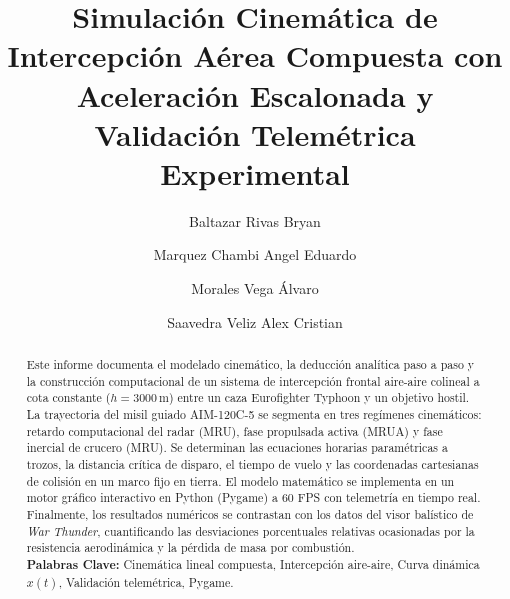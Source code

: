 \documentclass[11pt,letterpaper]{article}
\title{\textbf{Simulación Cinemática de Intercepción Aérea Compuesta con Aceleración Escalonada y Validación Telemétrica Experimental}}
\author[1,2]{Baltazar Rivas Bryan}
\author[1,2]{Marquez Chambi Angel Eduardo}
\author[1,2]{Morales Vega Álvaro}
\author[1,2]{Saavedra Veliz Alex Cristian}
\affil[1]{Departamento de Informática y Sistemas, Universidad Mayor de San Simón}
\affil[2]{Facultad de Ciencias y Tecnología, Universidad Mayor de San Simón}
\date{}
\begin{document}

\setcounter{page}{1}

\maketitle

\begin{abstract}
Este informe documenta el modelado cinemático, la deducción analítica paso a paso y la construcción computacional de un sistema de intercepción frontal aire-aire colineal a cota constante ($h = 3000\,\text{m}$) entre un caza Eurofighter Typhoon y un objetivo hostil. La trayectoria del misil guiado AIM-120C-5 se segmenta en tres regímenes cinemáticos: retardo computacional del radar (MRU), fase propulsada activa (MRUA) y fase inercial de crucero (MRU). Se determinan las ecuaciones horarias paramétricas a trozos, la distancia crítica de disparo, el tiempo de vuelo y las coordenadas cartesianas de colisión en un marco fijo en tierra. El modelo matemático se implementa en un motor gráfico interactivo en Python (Pygame) a 60 FPS con telemetría en tiempo real. Finalmente, los resultados numéricos se contrastan con los datos del visor balístico de \textit{War Thunder}, cuantificando las desviaciones porcentuales relativas ocasionadas por la resistencia aerodinámica y la pérdida de masa por combustión.
\\[0.5em]
\textbf{Palabras Clave:} Cinemática lineal compuesta, Intercepción aire-aire, Curva dinámica $x(t)$, Validación telemétrica, Pygame.
\end{abstract}
\end{document}
